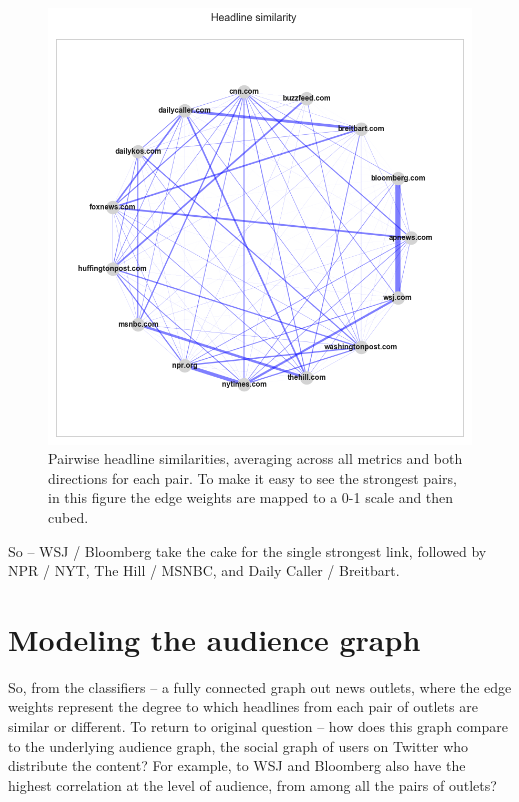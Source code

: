 \documentclass{scrartcl}
\begin{document}
\begin{figure}[H]
  \centering
  \includegraphics[height=0.5\textheight]{figures/hl-graph-radial-all-metrics.png}
  \caption{Pairwise headline similarities, averaging across all metrics and both directions for each pair. To make it easy to see the strongest pairs, in this figure the edge weights are mapped to a 0-1 scale and then cubed.}
\end{figure}

So -- WSJ / Bloomberg take the cake for the single strongest link, followed by NPR / NYT, The Hill / MSNBC, and Daily Caller / Breitbart.

\section{Modeling the audience graph}

So, from the classifiers -- a fully connected graph out news outlets, where the edge weights represent the degree to which headlines from each pair of outlets are similar or different. To return to original question -- how does this graph compare to the underlying audience graph, the social graph of users on Twitter who distribute the content? For example, to WSJ and Bloomberg also have the highest correlation at the level of audience, from among all the pairs of outlets?
\end{document}
